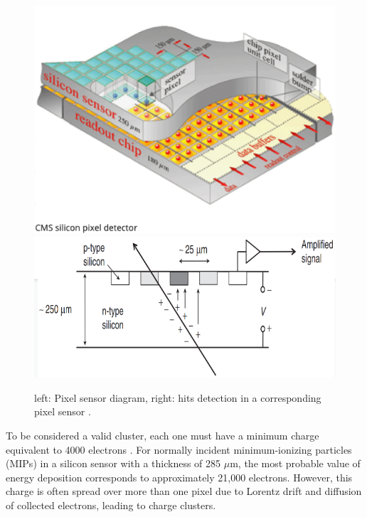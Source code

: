 \begin{center}
  \begin{figure}[h]
    \centering
    \includegraphics[scale=.3]{Chapter2/PixelSensor.png} \includegraphics[scale=.3]{Chapter2/hit.png}
    \caption[PixelSensor]{ left: Pixel sensor diagram, right: hits detection in a corresponding  pixel sensor \citep{thomson_2013}. }
    \label{module and hit}
  \end{figure}
\end{center}

To be considered a valid cluster, each one must have a minimum charge equivalent to 4000 electrons \cite{Track_Reco_2014,phase1_Pixel_Detector}. For normally incident minimum-ionizing particles (MIPs) in a silicon sensor with a thickness of 285 $\mu \text{m}$, the most probable value of energy deposition corresponds to approximately 21,000 electrons. However, this charge is often spread over more than one pixel due to Lorentz drift and diffusion of collected electrons, leading to charge clusters.\\

